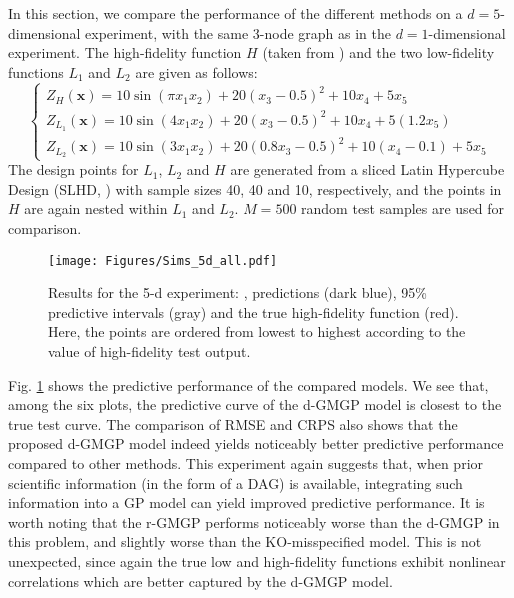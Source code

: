 \documentclass[12pt]{article}
\newcommand{\bs}[1]{\boldsymbol{#1}}
\newcommand{\cbl}[1]{{\color{black}{#1}}}
\begin{document}
In this section, we compare the performance of the different methods on a $d=5$-dimensional experiment, with the same 3-node graph as in the $d=1$-dimensional experiment. The high-fidelity function $H$ (taken from \cite{Friedman1991}) and the two low-fidelity functions $L_1$ and $L_2$ are given as follows:
\begin{equation*}
\begin{cases}
    Z_H(\bs{x}) = 10 \sin(\pi x_1 x_2)+20(x_3-0.5)^2 + 10 x_4 + 5 x_5\\
    Z_{L_1}(\bs{x}) = 10 \sin(4 x_1 x_2)+20(x_3-0.5)^2 + 10 x_4 + 5 (1.2 x_5)\\
    Z_{L_2}(\bs{x}) = 10 \sin(3 x_1 x_2)+20(0.8 x_3-0.5)^2 + 10 (x_4-0.1) + 5 x_5
\end{cases}
\end{equation*}
\noindent The design points for $L_1$, $L_2$ and $H$ are generated from a sliced Latin Hypercube Design (SLHD, \citealp{Ba2015SLHD}) with sample sizes 40, 40 and 10, respectively, and the points in $H$ are again nested within $L_1$ and $L_2$. $M=500$ random test samples are used for comparison.

\begin{figure}[!h]
    \centering
    \texttt{[image: Figures/Sims\_5d\_all.pdf]}
  \caption{Results for the 5-d experiment: \cbl{three predictive metrics (RMSE, N-RMSE, CRPS)}, predictions (dark blue), 95\% predictive intervals (gray) and the true high-fidelity function (red). Here, the points are ordered from lowest to highest according to the value of high-fidelity test output.}
  \label{fig:Example5d}
\end{figure}

Fig. \ref{fig:Example5d} shows the predictive performance of the compared models. We see that, among the six plots, the predictive curve of the d-GMGP model is closest to the true test curve. The comparison of RMSE\cbl{, N-RMSE} and CRPS also shows that the proposed d-GMGP model indeed yields noticeably better predictive performance compared to other methods. This experiment again suggests that, when prior scientific information (in the form of a DAG) is available, integrating such information into a GP model can yield improved predictive performance. It is worth noting that the r-GMGP performs noticeably worse than the d-GMGP in this problem, and slightly worse than the KO-misspecified model. This is not unexpected, since again the true low and high-fidelity functions exhibit nonlinear correlations which are better captured by the d-GMGP model.
\end{document}
